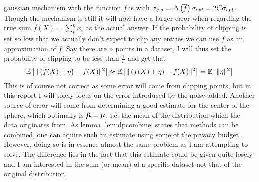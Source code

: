 \documentclass[a4paper,12pt]{article}
\begin{document}
gaussian mechanism with the function $\overline{f}$ is \edp with
$\sigma_{\varepsilon, \delta} = \Delta\left (\overline{f}\right) \sigma_{opt} = 2C \sigma_{opt}$.
Though the mechanism is still \edp it will now have 
a larger error when regarding the true sum
$f(X) = \sum_i^n x_i$ as the actual answer. If the probability of clipping is set
so low that we actually don't expect to clip any entries we can use $\overline{f}$ as an approximation of $f$.
Say there are $n$ points in a dataset, I will thus set the probability of clipping to be less than $\frac{1}{n}$ and get that
\[
    \mathbb{E} \left [ \| \left (\overline{f}(X) + \eta\right) - f(X) \|^2 \right] \approx \mathbb{E} \left [ \| \left (f(X) + \eta\right) - f(X) \|^2 \right] = \mathbb{E} \left [ \| \eta \|^2 \right]
\]
This is of course not correct as some error will come from clipping points, but in this report 
I will solely focus on the error introduced by the noise added. Another source of error will come from
determining a good estimate for the center of the sphere, which optimally is $\bm{\hat{\mu}} = \bm{\mu}$, i.e. 
the mean of the distribution which the data originates from.
As lemma \ref{lem:dpcombine} states that \edp methods can be combined,
one can aquire such an estimate using some of the privacy budget.
However, doing so is in essence almost the same problem as I am attempting to solve.
The difference lies in the fact that this estimate could be given quite 
losely and I am interested in the sum (or mean) of a specific dataset not that of the original distribution. \\
\end{document}
